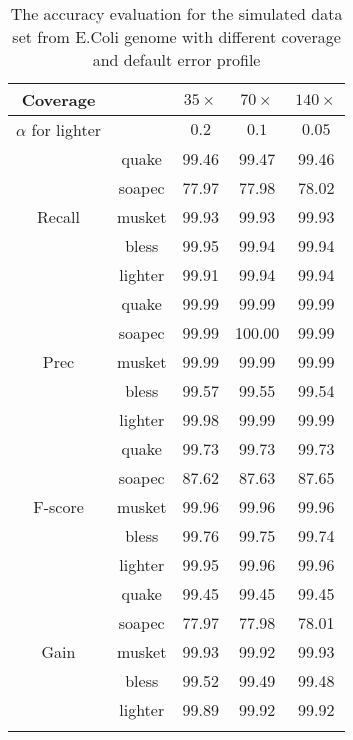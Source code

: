 \documentclass[10pt]{article}
\begin{document}
\begin{table}[h!]
\caption{The accuracy evaluation for the simulated data set from E.Coli genome with different coverage and default error profile}
\begin{tabular}{|c|c|c|c|c|} \hline
Coverage &	&$35\times$  & $70\times$ & $140\times$ \\ \hline
$\alpha$ for lighter & & $0.2$ & $0.1$ & $0.05$ \\ \hhline{|=|=|=|=|=|}
		&quake	&99.46	&99.47	&99.46 \\ \hline
		&soapec	&77.97	&77.98	&78.02  \\ \hline 
Recall	&musket	&99.93	&99.93	&99.93  \\ \hline
		&bless	&99.95	&99.94	&99.94  \\ \hline
		&lighter&99.91	&99.94	&99.94  \\ \hhline{|=|=|=|=|=|}
		
		&quake	&99.99	&99.99	&99.99  \\ \hline
		&soapec	&99.99	&100.00	&99.99   \\ \hline
Prec	&musket	&99.99	&99.99	&99.99   \\ \hline
		&bless	&99.57	&99.55	&99.54	 \\ \hline
		&lighter	&99.98	&99.99	&99.99 \\ \hhline{|=|=|=|=|=|}
		
		&quake	&99.73	&99.73	&99.73	 \\ \hline
		&soapec	&87.62	&87.63	&87.65	 \\ \hline
F-score	&musket	&99.96	&99.96	&99.96	 \\ \hline
		&bless	&99.76	&99.75	&99.74	 \\ \hline
		&lighter	&99.95	&99.96	&99.96	\\ \hhline{|=|=|=|=|=|}
		
		&quake	&99.45	&99.45	&99.45	 \\ \hline
		&soapec	&77.97	&77.98	&78.01	 \\ \hline
Gain	&musket	&99.93	&99.92	&99.93	 \\ \hline
		&bless	&99.52	&99.49	&99.48	 \\ \hline
		&lighter	&99.89	&99.92	&99.92 \\ \hhline{|=|=|=|=|=|}
	
\end{tabular}
\end{table}




\end{document}
